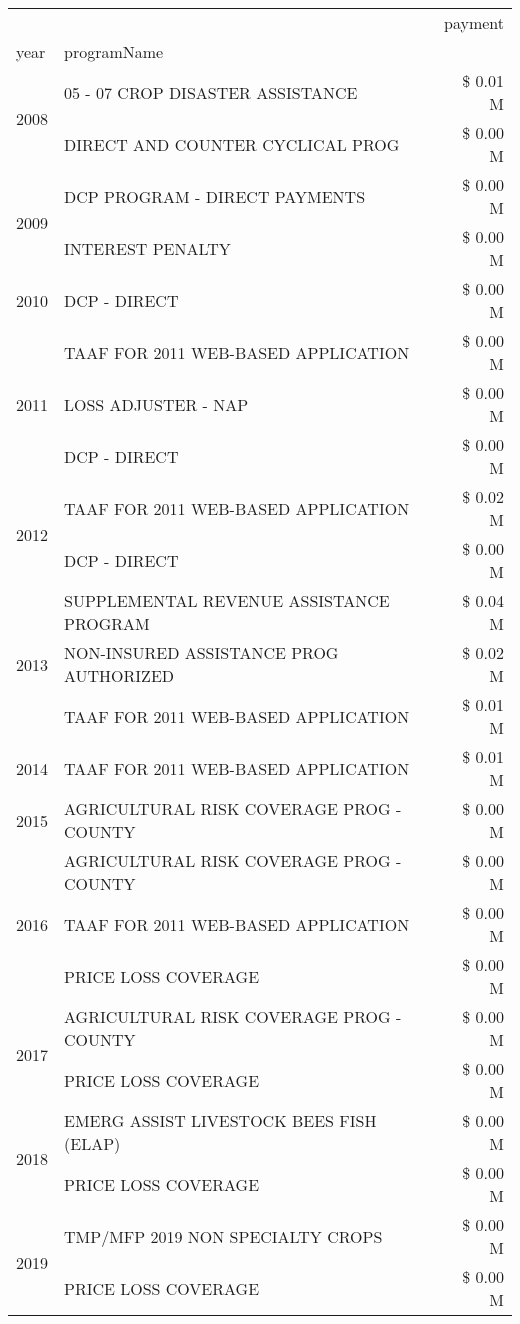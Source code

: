 \begin{tabular}{llr}
\toprule
 &  & payment \\
year & programName &  \\
\midrule
\multirow[t]{2}{*}{2008} & 05 - 07 CROP DISASTER ASSISTANCE & \$ 0.01 M \\
 & DIRECT AND COUNTER CYCLICAL PROG & \$ 0.00 M \\
\cline{1-3}
\multirow[t]{2}{*}{2009} & DCP PROGRAM - DIRECT PAYMENTS & \$ 0.00 M \\
 & INTEREST PENALTY & \$ 0.00 M \\
\cline{1-3}
2010 & DCP - DIRECT & \$ 0.00 M \\
\cline{1-3}
\multirow[t]{3}{*}{2011} & TAAF FOR 2011 WEB-BASED APPLICATION & \$ 0.00 M \\
 & LOSS ADJUSTER - NAP & \$ 0.00 M \\
 & DCP - DIRECT & \$ 0.00 M \\
\cline{1-3}
\multirow[t]{2}{*}{2012} & TAAF FOR 2011 WEB-BASED APPLICATION & \$ 0.02 M \\
 & DCP - DIRECT & \$ 0.00 M \\
\cline{1-3}
\multirow[t]{3}{*}{2013} & SUPPLEMENTAL REVENUE ASSISTANCE PROGRAM & \$ 0.04 M \\
 & NON-INSURED ASSISTANCE PROG AUTHORIZED & \$ 0.02 M \\
 & TAAF FOR 2011 WEB-BASED APPLICATION & \$ 0.01 M \\
\cline{1-3}
2014 & TAAF FOR 2011 WEB-BASED APPLICATION & \$ 0.01 M \\
\cline{1-3}
2015 & AGRICULTURAL RISK COVERAGE PROG - COUNTY & \$ 0.00 M \\
\cline{1-3}
\multirow[t]{3}{*}{2016} & AGRICULTURAL RISK COVERAGE PROG - COUNTY & \$ 0.00 M \\
 & TAAF FOR 2011 WEB-BASED APPLICATION & \$ 0.00 M \\
 & PRICE LOSS COVERAGE & \$ 0.00 M \\
\cline{1-3}
\multirow[t]{2}{*}{2017} & AGRICULTURAL RISK COVERAGE PROG - COUNTY & \$ 0.00 M \\
 & PRICE LOSS COVERAGE & \$ 0.00 M \\
\cline{1-3}
\multirow[t]{2}{*}{2018} & EMERG ASSIST LIVESTOCK BEES FISH (ELAP) & \$ 0.00 M \\
 & PRICE LOSS COVERAGE & \$ 0.00 M \\
\cline{1-3}
\multirow[t]{2}{*}{2019} & TMP/MFP 2019 NON SPECIALTY CROPS & \$ 0.00 M \\
 & PRICE LOSS COVERAGE & \$ 0.00 M \\

\end{tabular}
